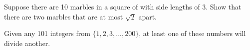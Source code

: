 \documentclass[12pt]{amsart}
\begin{document}
\begin{question}
	Suppose there are 10 marbles in a square of with side lengths of 3.
	Show that there are two marbles that are at most $\sqrt2$ apart.
\end{question}

\begin{question}[Hard]
	Given any 101 integers from $\{1, 2, 3, . . . , 200\}$, at least one of these numbers will divide another.
\end{question}

\printbibliography
%
%
\end{document}

